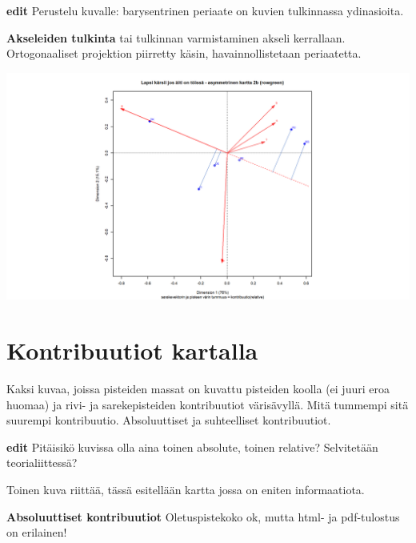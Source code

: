 \documentclass[
  finnish,
]{book}
\begin{document}
\textbf{edit} Perustelu kuvalle: barysentrinen periaate on kuvien
tulkinnassa ydinasioita.

\textbf{Akseleiden tulkinta} tai tulkinnan varmistaminen akseli
kerrallaan. Ortogonaaliset projektion piirretty käsin,
havainnollistetaan periaatetta.

\begin{center}\includegraphics[width=0.9\linewidth]{img/simpleCAasymmTulk2} \end{center}

\hypertarget{kontribuutiot-kartalla}{%
\section{Kontribuutiot kartalla}\label{kontribuutiot-kartalla}}

Kaksi kuvaa, joissa pisteiden massat on kuvattu pisteiden koolla (ei
juuri eroa huomaa) ja rivi- ja sarekepisteiden kontribuutiot
värisävyllä. Mitä tummempi sitä suurempi kontribuutio. Absoluuttiset ja
suhteelliset kontribuutiot.

\textbf{edit} Pitäisikö kuvissa olla aina toinen absolute, toinen
relative? Selvitetään teorialiittessä?

Toinen kuva riittää, tässä esitellään kartta jossa on eniten
informaatiota.

\textbf{Absoluuttiset kontribuutiot} Oletuspistekoko ok, mutta html- ja
pdf-tulostus on erilainen!
\end{document}
